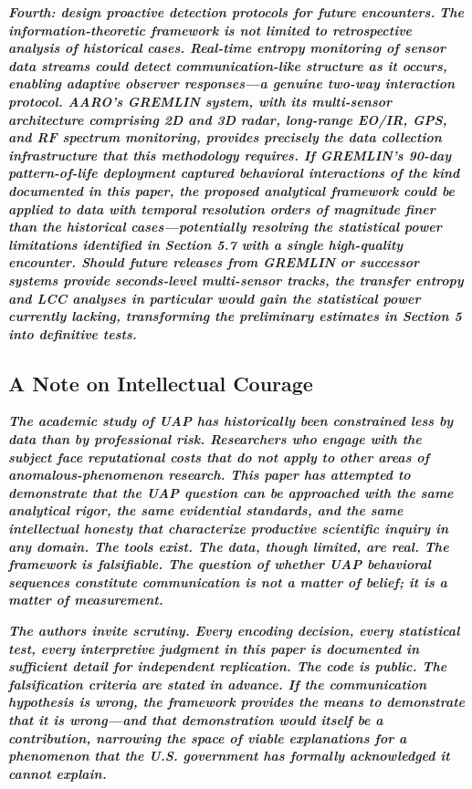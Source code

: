 \documentclass[11pt,letterpaper]{article}
\begin{document}
\textbf{\textit{Fourth: design proactive detection protocols for future encounters.}}\textbf{\textit{ The information-theoretic framework is not limited to retrospective analysis of historical cases. Real-time entropy monitoring of sensor data streams could detect communication-like structure as it occurs, enabling adaptive observer responses---a genuine two-way interaction protocol. AARO's GREMLIN system, with its multi-sensor architecture comprising 2D and 3D radar, long-range EO/IR, GPS, and RF spectrum monitoring, provides precisely the data collection infrastructure that this methodology requires. If GREMLIN's 90-day pattern-of-life deployment captured behavioral interactions of the kind documented in this paper, the proposed analytical framework could be applied to data with temporal resolution orders of magnitude finer than the historical cases---potentially resolving the statistical power limitations identified in Section 5.7 with a single high-quality encounter. Should future releases from GREMLIN or successor systems provide seconds-level multi-sensor tracks, the transfer entropy and LCC analyses in particular would gain the statistical power currently lacking, transforming the preliminary estimates in Section 5 into definitive tests.}}


\subsection{A Note on Intellectual Courage}

\textbf{\textit{The academic study of UAP has historically been constrained less by data than by professional risk. Researchers who engage with the subject face reputational costs that do not apply to other areas of anomalous-phenomenon research. This paper has attempted to demonstrate that the UAP question can be approached with the same analytical rigor, the same evidential standards, and the same intellectual honesty that characterize productive scientific inquiry in any domain. The tools exist. The data, though limited, are real. The framework is falsifiable. The question of whether UAP behavioral sequences constitute communication is not a matter of belief; it is a matter of measurement.}}


\textbf{\textit{The authors invite scrutiny. Every encoding decision, every statistical test, every interpretive judgment in this paper is documented in sufficient detail for independent replication. The code is public. The falsification criteria are stated in advance. If the communication hypothesis is wrong, the framework provides the means to demonstrate that it is wrong---and that demonstration would itself be a contribution, narrowing the space of viable explanations for a phenomenon that the U.S. government has formally acknowledged it cannot explain.}}
\end{document}

